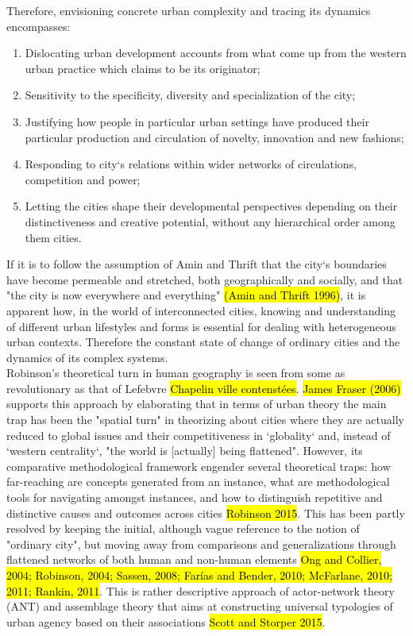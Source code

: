 \documentclass[11pt]{report}
\begin{document}
Therefore, envisioning concrete urban complexity and tracing its dynamics encompasses:
\begin{enumerate}
\item Dislocating urban development accounts from what come up from the western urban practice which claims to be its originator;
\item Sensitivity to the specificity, diversity and specialization of the city;
\item Justifying how  people  in particular urban settings  have  produced their  particular  production  and circulation of novelty, innovation and new fashions;
\item Responding to city‘s relations within wider networks of circulations, competition and power; 
\item Letting the  cities  shape their developmental perspectives depending  on  their  distinctiveness  and creative potential, without any hierarchical order among them cities.
\end{enumerate}

If it is to follow the assumption of Amin and Thrift that the city‘s boundaries have become permeable and stretched, both geographically and socially, and that "the city is  now  everywhere  and  everything"  \hl{(Amin  and  Thrift  1996)},  it  is  apparent  how,  in  the  world  of interconnected cities, knowing and understanding of different urban lifestyles and forms is essential for dealing with heterogeneous urban contexts.
Therefore the constant state of change of ordinary cities and the dynamics  of its complex systems. 
\\
Robinson's theoretical turn in human geography is seen from some as revolutionary as that of Lefebvre \hl{Chapelin ville contenstées}.
\hl{James Fraser (2006)} supports this approach by elaborating that  in  terms  of  urban  theory  the  main  trap  has  been  the "spatial  turn"  in  theorizing  about  cities  where  they  are  actually  reduced  to  global  issues  and  their competitiveness  in  ‘globality‘ and, instead of ‘western centrality‘, "the world is [actually] being flattened".
However, its comparative methodological framework engender several theoretical traps: how far-reaching are concepts generated from an instance, what are methodological tools for navigating amongst instances, and how to distinguish repetitive and distinctive causes and outcomes across cities \hl{Robinson 2015}.
This has been partly resolved by keeping the initial, although vague reference to the notion of "ordinary city", but moving away from comparisons and generalizations through flattened networks of both human and non-human elements \hl{Ong  and  Collier,  2004;  Robinson,  2004;  Sassen,  2008;  Farías  and Bender, 2010; McFarlane, 2010; 2011; Rankin, 2011}. This is rather descriptive approach of actor-network theory (ANT) and assemblage theory that aims at constructing universal typologies of urban agency based on their associations
\hl{Scott and Storper 2015}.
\end{document}
